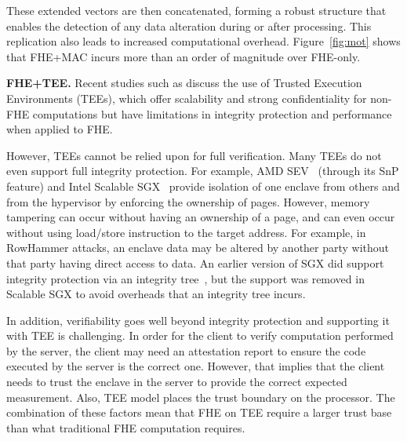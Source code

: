 These extended vectors are then concatenated, forming a robust structure that enables the detection of any data alteration during or after processing. This replication also leads to increased computational overhead. Figure~\ref{fig:mot} shows that FHE+MAC incurs more than an order of magnitude over FHE-only.  



\noindent\textbf{FHE+TEE.}
Recent studies such as \cite{natarajan2021chex, viand2023verifiable} discuss the use of Trusted Execution Environments (TEEs), which offer scalability and strong confidentiality for non-FHE computations but have limitations in integrity protection and performance when applied to FHE. 

However, TEEs cannot be relied upon for full verification. Many TEEs do not even support full integrity protection. For example, AMD SEV~\cite{AMD_SEV} (through its SnP feature) and Intel Scalable SGX~\cite{Intel_SGX} provide isolation of one enclave from others and from the hypervisor by enforcing the ownership of pages. However, memory tampering can occur without having an ownership of a page, and can even occur without using load/store instruction to the target address. For example, in RowHammer attacks, an enclave data may be altered by another party without that party having direct access to data. An earlier version of SGX did support integrity protection via an integrity tree~\cite{intel2021sgx}, but the support was removed in Scalable SGX to avoid overheads that an integrity tree incurs. 

In addition, verifiability goes well beyond integrity protection and supporting it with TEE is challenging. In order for the client to verify computation performed by the server, the client may need an attestation report to ensure the code executed by the server is the correct one. However, that implies that the client needs to trust the enclave in the server to provide the correct expected measurement. Also, TEE model places the trust boundary on the processor. The combination of these factors mean that FHE on TEE require a larger trust base than what traditional FHE computation requires. 

